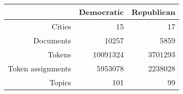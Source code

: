\begin{table}[ht]
\centering
\begin{tabular}{rrr}
  \hline
 & Democratic & Republican \\ 
  \hline
Cities & 15 & 17 \\ 
  Documents & 10257 & 5859 \\ 
  Tokens & 10091324 & 3701293 \\ 
  Token assignments & 5953078 & 2238028 \\ 
  Topics & 101 & 99 \\ 
   \hline
\end{tabular}
\end{table}

